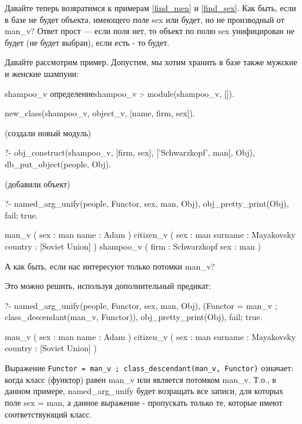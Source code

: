 \documentclass[a4paper]{book}
\begin{document}
Давайте теперь возвратимся к примерам \ref{find_men} и
\ref{find_sex}. Как быть, если в базе не будет объекта, имеющего
поле sex или будет, но не производный от man\_v? Ответ прост ---
если поля нет, то объект по полю sex унифицирован не будет (не
будет выбран), если есть - то будет.

Давайте рассмотрим пример. Допустим, мы хотим хранить в базе
также мужские и женские шампуни:

\begin{example}{shampoo\_v определение}{shampoo_v}
:- module(shampoo_v, []).

new_class(shampoo_v, object_v, [name, firm, sex]).
\end{example}

(создали новый модуль)

\begin{example}{}{}
?- obj_construct(shampoo_v, [firm, sex], 
                 ['Schwarzkopf', man], Obj),
    db_put_object(people, Obj).
\end{example}

(добавили объект)

\begin{example}{}{}
?- named_arg_unify(people, Functor, sex, man, Obj), 
   obj_pretty_print(Obj), fail; true.

man_v ( 
  sex : man 
  name : Adam 
) 
citizen_v ( 
  sex : man 
  surname : Mayakovsky 
  country : [Soviet Union] 
) 
shampoo_v ( 
  firm : Schwarzkopf 
  sex : man 
) 
\end{example}

А как быть, если нас интересуют только потомки man\_v?

Это можно решить, используя дополнительный предикат:

\begin{example}{}{}
?- named_arg_unify(people, Functor, sex, man, Obj), 
   (Functor = man_v ; class_descendant(man_v, Functor)), 
   obj_pretty_print(Obj), fail; true.

man_v ( 
  sex : man 
  name : Adam 
) 
citizen_v ( 
  sex : man 
  surname : Mayakovsky 
  country : [Soviet Union] 
) 
\end{example}

Выражение
\verb|Functor = man_v ; class_descendant(man_v, Functor)|
означает: когда класс (функтор) равен man\_v или является
потомком man\_v. Т.о., в данном примере, named\_arg\_unify будет
возращать все записи, для которых поле sex = man, а данное
выражение - пропускать только те, которые имеют соответствующий
класс. 
\end{document}
